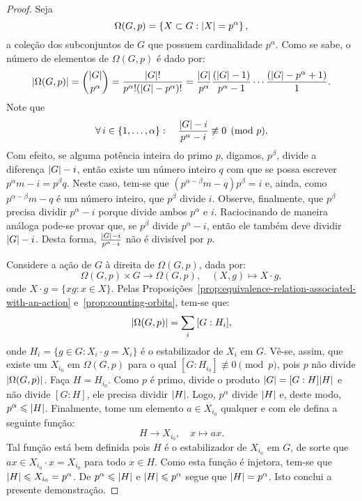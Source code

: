\begin{proof}
  Seja
  \[
    \Omega(G,p)
    =
    \left\{
      X\subset{G}
      :
      \lvert X\rvert=p^{\alpha}
    \right\},
  \]
  a coleção dos subconjuntos de $G$ que possuem cardinalidade $p^{\alpha}$. Como se sabe, o número de elementos de $\Omega(G,p)$ é dado por:
  \[
    \lvert\Omega(G,p)\rvert
    =
    \binom{\lvert G\rvert}{p^{\alpha}}
    =
    \frac{\lvert G\rvert!}{p^{\alpha}!(\lvert G\rvert-p^{\alpha})!}
    =
    \frac{\lvert G\rvert}{p^{\alpha}}\frac{(\lvert G\rvert-1)}{p^{\alpha}-1}\cdots\frac{(\lvert G\rvert-p^{\alpha}+1)}{1}.
  \]
  Note que
  \[
    \forall\,i\in\{1,\ldots,\alpha\}:\quad
    \frac{\lvert G\rvert-i}{p^{\alpha}-i}\not\equiv{0}\pmod{p},
  \]
  Com efeito, se alguma potência inteira do primo $p$, digamos, $p^{\beta}$, divide a diferença $\lvert G\rvert-i$, então existe um número inteiro $q$ com que se possa escrever $p^{\alpha}m-i=p^{\beta}q$. Neste caso, tem-se que $(p^{\alpha-\beta}m-q)p^{\beta}=i$ e, ainda, como $p^{\alpha-\beta}m-q$ é um número inteiro, que $p^{\beta}$ divide $i$. Observe, finalmente, que $p^{\beta}$ precisa dividir $p^{\alpha}-i$ porque divide ambos $p^{\alpha}$ e $i$. Raciocinando de maneira análoga pode-se provar que, se $p^{\beta}$ divide $p^{\alpha}-i$, então ele também deve dividir $\lvert G\rvert-i$. Desta forma, $\frac{\lvert G\rvert-i}{p^{\alpha}-i}$ não é divisível por $p$.

  Considere a ação de $G$ à direita de $\Omega(G,p)$, dada por:
  \[
    \Omega(G,p)\times{G}\to\Omega(G,p),\quad{(X,g)\mapsto{X\cdot{g}}},
  \]
  onde $X\cdot{g}=\{xg:x\in{X}\}$. Pelas Proposições~\ref{prop:equivalence-relation-associated-with-an-action} e~\ref{prop:counting-orbits}, tem-se que:
  \[
    \lvert\Omega(G,p)\rvert=\sum_{i}\,[G:H_{i}],
  \]
  onde $H_{i}=\{g\in{G}:X_{i}\cdot{g}=X_{i}\}$ é o estabilizador de $X_{i}$ em $G$. Vê-se, assim, que existe um $X_{i_{0}}$ em $\Omega(G,p)$ para o qual $[G:H_{i_{0}}]\not\equiv{0}\pmod{p}$, pois $p$ não divide $\lvert\Omega(G,p)\rvert$. Faça $H=H_{i_{0}}$. Como $p$ é primo, divide o produto $\lvert G\rvert=[G:H]\lvert H\rvert$ e não divide $[G:H]$, ele precisa dividir $\lvert H\rvert$. Logo, $p^{\alpha}$ divide $\lvert H\rvert$ e, deste modo, $p^{\alpha}\leqslant\lvert H\rvert$. Finalmente, tome um elemento $a\in{X_{i_{0}}}$ qualquer e com ele defina a seguinte função:
  \[
    H\to{X_{i_{0}}},\quad{x\mapsto{ax}}.
  \]
  Tal função está bem definida pois $H$ é o estabilizador de $X_{i_{0}}$ em $G$, de sorte que $ax\in{X_{i_{0}}}\cdot{x}=X_{i_{0}}$ para todo $x\in{H}$. Como esta função é injetora, tem-se que $\lvert H\rvert\leqslant{X_{i_{0}}}=p^{\alpha}$. De $p^{\alpha}\leqslant\lvert H\rvert$ e $\lvert H\rvert\leqslant{p^{\alpha}}$ segue que $\lvert H\rvert=p^{\alpha}$. Isto conclui a presente demonstração.
\end{proof}

